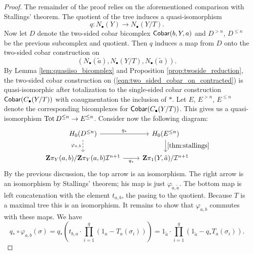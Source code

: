 \begin{prop}
\begin{proof}
        The remainder of the proof relies on the aforementioned comparison with Stallings' theorem. The quotient of the tree induces  a quasi-isomorphism
        \[q: N_\bullet(Y)  \to N_\bullet(Y/T).\] 
        Now let $D$ denote the two-sided cobar bicomplex $\operatorname{\mathsf{Cobar}}(b, Y, a)$
        and $D^{>n}$, $D^{\leq n}$ be the previous subcomplex and quotient. Then $q$ induces a map from $D$ onto the two-sided cobar construction on
        \begin{equation}\label{eqn:two_sided_cobar_on_contracted}
        (N_\bullet(\tilde{a}), N_\bullet(Y/T), N_\bullet(\tilde{a})).
        \end{equation}
        By Lemma \ref{lem:quasiiso_bicomplex} and Proposition \ref{prop:twoside_reduction}, the two-sided cobar construction on (\ref{eqn:two_sided_cobar_on_contracted}) is quasi-isomorphic after totalization to the single-sided cobar construction $\operatorname{\mathsf{Cobar}}(C_\bullet(Y/T))$ with coaugmentation the inclusion of $*$. Let $E$, $E^{>n}$, $E^{\leq n}$ denote the corresponding bicomplexes for $\operatorname{\mathsf{Cobar}}(C_\bullet(Y/T))$. This gives us a quasi-isomorphism $\operatorname{Tot} D^{\leq n}\to E^{\leq n}$. Consider now the following diagram:
        \[\begin{tikzcd}
            {H_0(D^{\leq n})} & {H_0(E^{\leq n})} \\
            {\Z\pi_Y(a,b)/\Z\pi_Y(a,b)\mathcal{I}^{n+1}} & {\Z\pi_1(Y, \tilde{a})/\mathcal{I}^{n+1}}
            \arrow["{q_*}", from=1-1, to=1-2]
            \arrow["{\varphi_{a,b}}"', dashed, from=1-1, to=2-1]
            \arrow["{\ref{thm:stallings}}", from=1-2, to=2-2]
            \arrow["{q_*}"', from=2-1, to=2-2]
        \end{tikzcd}\]
        By the previous discussion, the top arrow is an isomorphism. The right arrow is an isomorphism by Stallings' theorem; his map is just $\varphi_{\tilde{a},\tilde{a}}$. The bottom map is left concatenation with the element $t_{a,b}$, the pasing to the quotient. Because $T$ is a maximal tree this is an isomorphism. It remains to show that $\varphi_{a,b}$ commutes with these maps. We have 
        \[q_*\circ\varphi_{a,b}(\sigma) = q_*(t_{b,a}\cdot \prod_{i=1}^q(1_a - T_a(\sigma_i))) = 1_{\tilde{a}} \cdot \prod_{i=1}^q(1_{\tilde{a}} - q_*T_a(\sigma_i)).\]

\end{proof}
\end{prop}
